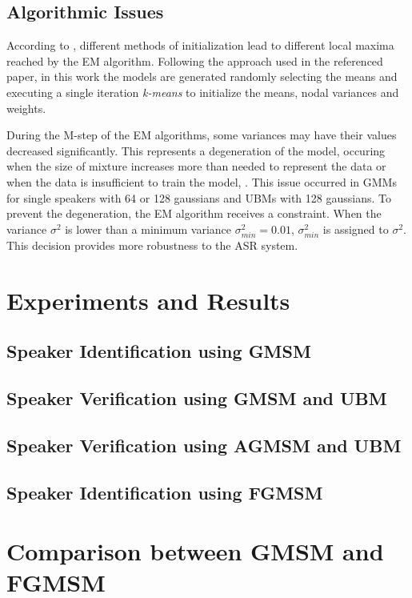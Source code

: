 \subsection{Algorithmic Issues}

According to , different methods of initialization lead to different local maxima reached by the EM algorithm. Following the approach used in the referenced paper, in this work the models are generated randomly selecting the means and executing a single iteration \emph{k-means} to initialize the means, nodal variances and weights.

During the M-step of the EM algorithms, some variances may have their values decreased significantly. This represents a degeneration of the model, occuring when the size of mixture increases more than needed to represent the data or when the data is insufficient to train the model, . This issue occurred in GMMs for single speakers with 64 or 128 gaussians and UBMs with 128 gaussians. To prevent the degeneration, the EM algorithm receives a constraint. When the variance $\sigma^2$ is lower than a minimum variance $\sigma_{min}^2 = 0.01$, $\sigma_{min}^2$ is assigned to $\sigma^2$. This decision provides more robustness to the ASR system.

\section{Experiments and Results}
\label{sec:experiments-and-results}

\subsection{Speaker Identification using GMSM}

\subsection{Speaker Verification using GMSM and UBM}

\subsection{Speaker Verification using AGMSM and UBM}

\subsection{Speaker Identification using FGMSM}

\section{Comparison between GMSM and FGMSM}